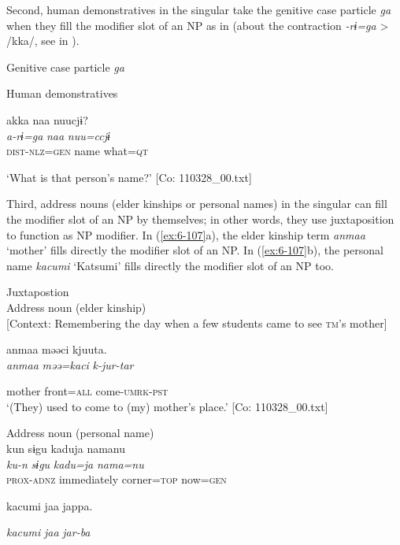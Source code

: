 \begin{table}
  Second, human demonstratives in the singular take the genitive case particle \textit{ga} when they fill the modifier slot of an NP as in  (about the contraction \textit{-rɨ=ga} > /kka/, see  in ).

\ea\label{ex:6-106}
  Genitive case particle \textit{ga}

  Human demonstratives

{\TM}
\glll akka  naa  nuucjɨ?\\
\textit{a-rɨ=ga}  \textit{naa}  \textit{nuu=ccjɨ}\\

    \textsc{dist}-\textsc{nlz}=\textsc{gen}  name  what=\textsc{qt}

\glt    ‘What is that person’s name?’ [Co: 110328\_00.txt]
\z

  Third, address nouns (elder kinships or personal names) in the singular can fill the modifier slot of an NP by themselves; in other words, they use juxtaposition to function as NP modifier. In (\ref{ex:6-107}a), the elder kinship term \textit{anmaa} ‘mother’ fills directly the modifier slot of an NP. In (\ref{ex:6-107}b), the personal name \textit{kacumi} ‘Katsumi’ fills directly the modifier slot of an NP too.

\ea\label{ex:6-107}
 Juxtapostion\\

 \ea Address noun (elder kinship)\\{}
[Context: Remembering the day when a few students came to see \textsc{tm}’s mother]

{\TM}
\glll anmaa  məəci  kjuuta.\\

      \textit{anmaa}  \textit{məə=kaci}  \textit{k-jur-tar}

      mother  front=\textsc{all}  come-\textsc{umrk}-\textsc{pst}\\
\glt ‘(They) used to come to (my) mother’s place.’ [Co: 110328\_00.txt]
\z

\ex Address noun (personal name)\\
{\TM}
\glll  kun  sɨgu  kaduja  namanu\\
\textit{ku-n}  \textit{sɨgu}  \textit{kadu=ja}  \textit{nama=nu}\\
\textsc{prox}-\textsc{adnz}  immediately  corner=\textsc{top}  now=\textsc{gen}

      kacumi  jaa  jappa.

      \textit{kacumi}  \textit{jaa}  \textit{jar-ba}


\end{table}
